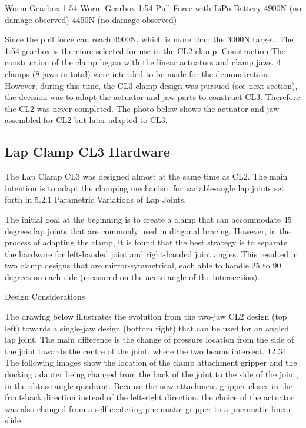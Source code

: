 Worm Gearbox 1:54 
Worm Gearbox 1:54 
Pull Force with LiPo Battery
4900N (no damage observed)
4450N (no damage observed)

Since the pull force can reach 4900N, which is more than the 3000N target. The 1:54 gearbox is therefore selected for use in the CL2 clamp.
Construction 
The construction of the clamp began with the linear actuators and clamp jaws. 4 clamps (8 jaws in total) were intended to be made for the demonstration. However, during this time, the CL3 clamp design was pursued (see next section), the decision was to adapt the actuator and jaw parts to construct CL3. Therefore the CL2 was never completed. The photo below shows the actuator and jaw assembled for CL2 but later adapted to CL3.


\subsection{Lap Clamp CL3 Hardware}
\label{subsection:exploration_2_lap_clamp_cl3_hardware}

The Lap Clamp CL3 was designed almost at the same time as CL2. The main intention is to adapt the clamping mechanism for variable-angle lap joints set forth in 5.2.1 Parametric Variations of Lap Joints. 

The initial goal at the beginning is to create a clamp that can accommodate 45 degrees lap joints that are commonly used in diagonal bracing. However, in the process of adapting the clamp, it is found that the best strategy is to separate the hardware for left-handed joint and right-handed joint angles. This resulted in two clamp designs that are mirror-symmetrical, each able to handle 25 to 90 degrees on each side (measured on the acute angle of the intersection). 

Design Considerations

The drawing below illustrates the evolution from the two-jaw CL2 design (top left) towards a single-jaw design (bottom right) that can be used for an angled lap joint. The main difference is the change of pressure location from the side of the joint towards the centre of the joint, where the two beams intersect.
12
34
The following images show the location of the clamp attachment gripper and the docking adapter being changed from the back of the joint to the side of the joint, in the obtuse angle quadrant. Because the new attachment gripper closes in the front-back direction instead of the left-right direction, the choice of the actuator was also changed from a self-centering pneumatic gripper to a pneumatic linear slide.


